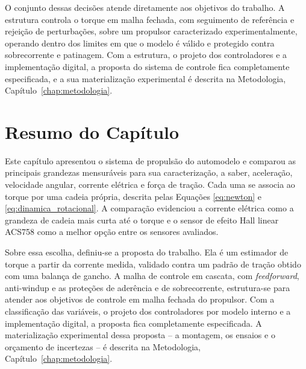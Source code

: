 O conjunto dessas decisões atende diretamente aos objetivos do trabalho. A estrutura
controla o torque em malha fechada, com seguimento de referência e rejeição de
perturbações, sobre um propulsor caracterizado experimentalmente, operando dentro dos
limites em que o
modelo é válido e protegido contra sobrecorrente e patinagem. Com a estrutura, o projeto
dos controladores e a implementação digital, a proposta do sistema de controle fica
completamente especificada, e a sua materialização experimental é descrita na Metodologia,
Capítulo~\ref{chap:metodologia}.

\section{Resumo do Capítulo}
\label{sec:resumocap2}

Este capítulo apresentou o sistema de propulsão do automodelo e comparou as principais grandezas
mensuráveis para sua caracterização, a saber, aceleração, velocidade angular, corrente elétrica e
força de tração. Cada uma se associa ao torque por uma cadeia própria, descrita pelas Equações
\eqref{eq:newton} e \eqref{eq:dinamica_rotacional}. A
comparação evidenciou a corrente elétrica como a grandeza de cadeia mais curta até o torque e o
sensor de efeito Hall linear ACS758 como a melhor opção entre os sensores avaliados.

Sobre essa escolha, definiu-se a proposta do trabalho. Ela é um estimador de torque a partir da
corrente medida, validado contra um padrão de tração obtido com uma balança de gancho.
A malha de controle em cascata, com \emph{feedforward}, anti-windup e as proteções de
aderência e de sobrecorrente, estrutura-se para atender aos objetivos de controle em
malha fechada do propulsor. Com a classificação das variáveis, o projeto dos
controladores por modelo interno e a implementação digital, a proposta fica completamente
especificada. A materialização experimental dessa proposta -- a montagem,
os ensaios e o orçamento de incertezas -- é descrita na Metodologia,
Capítulo~\ref{chap:metodologia}.

\clearpage
